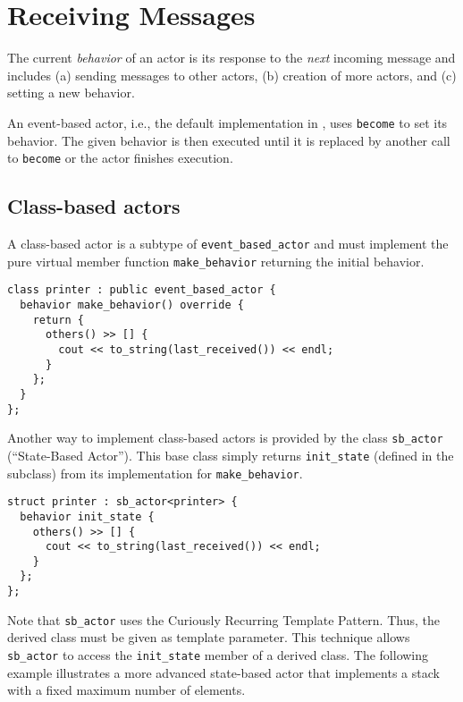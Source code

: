 \section{Receiving Messages}
\label{Sec::Receive}

The current \textit{behavior} of an actor is its response to the \textit{next} incoming message and includes (a) sending messages to other actors, (b) creation of more actors, and (c) setting a new behavior.

An event-based actor, i.e., the default implementation in \libcppa, uses \lstinline^become^ to set its behavior.
The given behavior is then executed until it is replaced by another call to \lstinline^become^ or the actor finishes execution.

\subsection{Class-based actors}

A class-based actor is a subtype of \lstinline^event_based_actor^ and must implement the pure virtual member function \lstinline^make_behavior^ returning the initial behavior.

\begin{lstlisting}
class printer : public event_based_actor {
  behavior make_behavior() override {
    return {
      others() >> [] {
        cout << to_string(last_received()) << endl;
      }
    };
  }
};
\end{lstlisting}

Another way to implement class-based actors is provided by the class \lstinline^sb_actor^ (``State-Based Actor'').
This base class simply returns \lstinline^init_state^ (defined in the subclass) from its implementation for \lstinline^make_behavior^.

\begin{lstlisting}
struct printer : sb_actor<printer> {
  behavior init_state {
    others() >> [] {
      cout << to_string(last_received()) << endl;
    }
  };
};
\end{lstlisting}

Note that \lstinline^sb_actor^ uses the Curiously Recurring Template Pattern. Thus, the derived class must be given as template parameter.
This technique allows \lstinline^sb_actor^ to access the \lstinline^init_state^ member of a derived class.
The following example illustrates a more advanced state-based actor that implements a stack with a fixed maximum number of elements.

